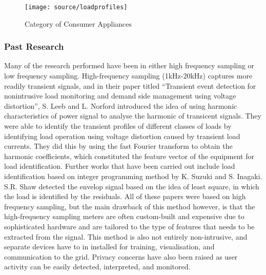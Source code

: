 \documentclass[12pt,twocolumn]{article}
\begin{document}
			\begin{figure}[!h]
					\centering
					\texttt{[image: source/loadprofiles]}
					\caption{Category of Consumer Appliances}
				\end{figure}

			\subsubsection*{Past Research}
			\quad Many of the research performed have been in either high frequency sampling or low frequency sampling. High-frequency sampling (1kHz-20kHz) captures more readily transient signals, and in their paper titled ``Transient event detection for nonintrusive load monitoring and demand side management using voltage distortion'', S. Leeb and L. Norford introduced the idea of using harmonic characteristics of power signal to analyse the harmonic of transicent signals. They were able to identify the transient profiles of different classes of loads by identifying load operation using voltage distortion caused by transient load currents. They did this by using the fast Fourier transform to obtain the harmonic coefficients, which constituted the feature vector of the equipment for load identification. Further works that have been carried out include load identification based on integer programming method by K. Suzuki and S. Inagaki. S.R. Shaw detected the envelop signal based on the idea of least square, in which the load is identified by the residuals. All of these papers were based on high frequency sampling, but the main drawback of this method however, is that the high-frequency sampling meters are often custom-built and expensive due to sophisticated hardware and are tailored to the type of features that needs to be extracted from the signal. This method is also not entirely non-intrusive, and separate devices have to in installed for training, visualisation, and communication to the grid. Privacy concerns have also been raised as user activity can be easily detected, interpreted, and monitored. \newline
\end{document}
